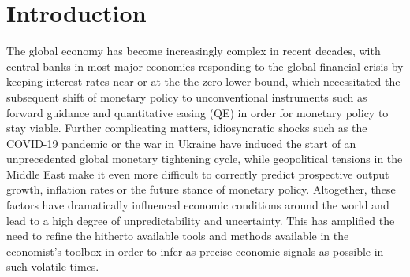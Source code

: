\section{Introduction}
\label{sec:intro}


The global economy has become increasingly complex in recent decades, with central banks in most major economies responding to the global financial crisis by keeping interest rates near or at the the zero lower bound, which necessitated the subsequent shift of monetary policy to unconventional instruments such as forward guidance and quantitative easing (QE) in order for monetary policy to stay viable. 
Further complicating matters, idiosyncratic shocks such as the COVID-19 pandemic or the war in Ukraine have induced the start of an unprecedented global monetary tightening cycle, while geopolitical tensions in the Middle East make it even more difficult to correctly predict prospective output growth, inflation rates or the future stance of monetary policy. 
Altogether, these factors have dramatically influenced economic conditions around the world and lead to a high degree of unpredictability and uncertainty. 
This has amplified the need to refine the hitherto available tools and methods available in the economist's toolbox in order to infer as precise economic signals as possible in such volatile times.

